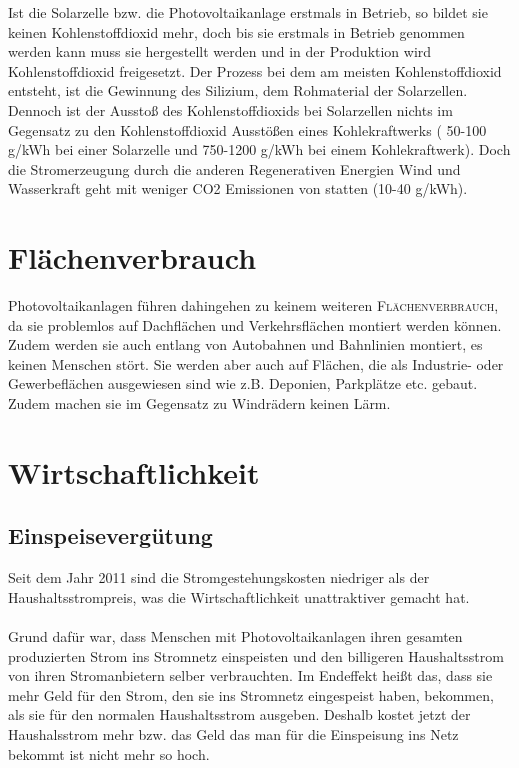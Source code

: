 \documentclass[12pt]{scrbook}
\begin{document}
Ist die Solarzelle bzw. die Photovoltaikanlage erstmals in Betrieb, so bildet
sie keinen Kohlenstoffdioxid mehr, doch bis sie erstmals in Betrieb genommen
werden kann muss sie hergestellt werden und in der Produktion wird
Kohlenstoffdioxid freigesetzt. Der Prozess bei dem am meisten
Kohlenstoffdioxid entsteht, ist die Gewinnung des Silizium, dem Rohmaterial
der Solarzellen. Dennoch ist der Ausstoß des Kohlenstoffdioxids bei
Solarzellen nichts im Gegensatz zu den Kohlenstoffdioxid Ausstößen eines
Kohlekraftwerks ( 50-100 g/kWh bei einer Solarzelle und 750-1200 g/kWh bei
einem Kohlekraftwerk). Doch die Stromerzeugung durch die anderen
Regenerativen Energien Wind und Wasserkraft geht mit weniger CO2 Emissionen
von statten (10-40 g/kWh).

\section{Flächenverbrauch}

Photovoltaikanlagen führen dahingehen zu keinem weiteren \textsc{Flächenverbrauch}, da
sie problemlos auf Dachflächen und Verkehrsflächen montiert werden können.
Zudem werden sie auch entlang von Autobahnen und Bahnlinien montiert, es
keinen Menschen stört. Sie werden aber auch auf Flächen, die als Industrie-
oder Gewerbeflächen ausgewiesen sind wie z.B. Deponien, Parkplätze etc.
gebaut. Zudem machen sie im Gegensatz zu Windrädern keinen Lärm.


\newpage

\section{Wirtschaftlichkeit}

\subsection{Einspeisevergütung}

Seit dem Jahr 2011 sind die Stromgestehungskosten niedriger als der
Haushaltsstrompreis, was die Wirtschaftlichkeit unattraktiver gemacht hat.\\
\\
Grund dafür war, dass Menschen mit Photovoltaikanlagen ihren gesamten
produzierten Strom ins Stromnetz einspeisten und den billigeren Haushaltsstrom
von ihren Stromanbietern selber verbrauchten. Im Endeffekt heißt das, dass sie
mehr Geld für den Strom, den sie ins Stromnetz eingespeist haben, bekommen,
als sie für den normalen Haushaltsstrom ausgeben. Deshalb kostet jetzt der
Haushalsstrom mehr bzw. das Geld das man für die Einspeisung ins Netz bekommt
ist nicht mehr so hoch.
\end{document}
